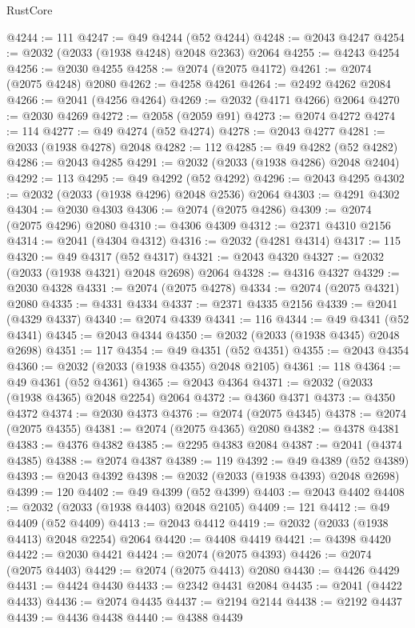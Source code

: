 \begin{lexlean}{RustCore}
\begin{coremodule}
@4244 := 111
@4247 := @49 @4244 (@52 @4244)
@4248 := @2043 @4247
@4254 := @2032 (@2033 (@1938 @4248) @2048 @2363) @2064
@4255 := @4243 @4254
@4256 := @2030 @4255
@4258 := @2074 (@2075 @4172)
@4261 := @2074 (@2075 @4248) @2080
@4262 := @4258 @4261
@4264 := @2492 @4262 @2084
@4266 := @2041 (@4256 @4264)
@4269 := @2032 (@4171 @4266) @2064
@4270 := @2030 @4269
@4272 := @2058 (@2059 @91)
@4273 := @2074 @4272
@4274 := 114
@4277 := @49 @4274 (@52 @4274)
@4278 := @2043 @4277
@4281 := @2033 (@1938 @4278) @2048
@4282 := 112
@4285 := @49 @4282 (@52 @4282)
@4286 := @2043 @4285
@4291 := @2032 (@2033 (@1938 @4286) @2048 @2404)
@4292 := 113
@4295 := @49 @4292 (@52 @4292)
@4296 := @2043 @4295
@4302 := @2032 (@2033 (@1938 @4296) @2048 @2536) @2064
@4303 := @4291 @4302
@4304 := @2030 @4303
@4306 := @2074 (@2075 @4286)
@4309 := @2074 (@2075 @4296) @2080
@4310 := @4306 @4309
@4312 := @2371 @4310 @2156
@4314 := @2041 (@4304 @4312)
@4316 := @2032 (@4281 @4314)
@4317 := 115
@4320 := @49 @4317 (@52 @4317)
@4321 := @2043 @4320
@4327 := @2032 (@2033 (@1938 @4321) @2048 @2698) @2064
@4328 := @4316 @4327
@4329 := @2030 @4328
@4331 := @2074 (@2075 @4278)
@4334 := @2074 (@2075 @4321) @2080
@4335 := @4331 @4334
@4337 := @2371 @4335 @2156
@4339 := @2041 (@4329 @4337)
@4340 := @2074 @4339
@4341 := 116
@4344 := @49 @4341 (@52 @4341)
@4345 := @2043 @4344
@4350 := @2032 (@2033 (@1938 @4345) @2048 @2698)
@4351 := 117
@4354 := @49 @4351 (@52 @4351)
@4355 := @2043 @4354
@4360 := @2032 (@2033 (@1938 @4355) @2048 @2105)
@4361 := 118
@4364 := @49 @4361 (@52 @4361)
@4365 := @2043 @4364
@4371 := @2032 (@2033 (@1938 @4365) @2048 @2254) @2064
@4372 := @4360 @4371
@4373 := @4350 @4372
@4374 := @2030 @4373
@4376 := @2074 (@2075 @4345)
@4378 := @2074 (@2075 @4355)
@4381 := @2074 (@2075 @4365) @2080
@4382 := @4378 @4381
@4383 := @4376 @4382
@4385 := @2295 @4383 @2084
@4387 := @2041 (@4374 @4385)
@4388 := @2074 @4387
@4389 := 119
@4392 := @49 @4389 (@52 @4389)
@4393 := @2043 @4392
@4398 := @2032 (@2033 (@1938 @4393) @2048 @2698)
@4399 := 120
@4402 := @49 @4399 (@52 @4399)
@4403 := @2043 @4402
@4408 := @2032 (@2033 (@1938 @4403) @2048 @2105)
@4409 := 121
@4412 := @49 @4409 (@52 @4409)
@4413 := @2043 @4412
@4419 := @2032 (@2033 (@1938 @4413) @2048 @2254) @2064
@4420 := @4408 @4419
@4421 := @4398 @4420
@4422 := @2030 @4421
@4424 := @2074 (@2075 @4393)
@4426 := @2074 (@2075 @4403)
@4429 := @2074 (@2075 @4413) @2080
@4430 := @4426 @4429
@4431 := @4424 @4430
@4433 := @2342 @4431 @2084
@4435 := @2041 (@4422 @4433)
@4436 := @2074 @4435
@4437 := @2194 @2144
@4438 := @2192 @4437
@4439 := @4436 @4438
@4440 := @4388 @4439

\end{coremodule}
\end{lexlean}
